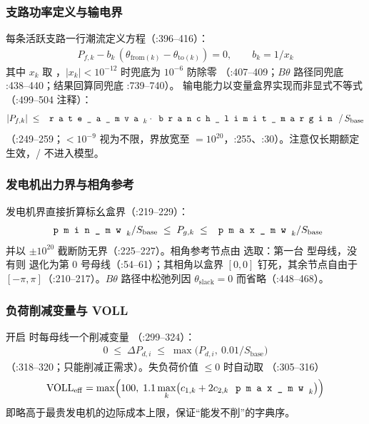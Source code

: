\subsubsection*{支路功率定义与输电界}
每条活跃支路一行潮流定义方程（:396--416）：
\begin{align*}
P_{f,k} - b_k\,(\theta_{\mathrm{from}(k)}-\theta_{\mathrm{to}(k)}) = 0,
\qquad b_k = 1/x_k
\end{align*}
其中 $x_k$ 取 ，$|x_k|<10^{-12}$ 时兜底为 $10^{-6}$ 防除零
（:407--409；$B\theta$ 路径同兜底 :438--440；结果回算同兜底 :739--740）。
输电能力以变量盒界实现而非显式不等式（:499--504 注释）：
\begin{align*}
|P_{f,k}| \;\le\; \fld{rate\_a\_mva}_k\cdot\fld{branch\_limit\_margin}\,/\,S_{\mathrm{base}}
\end{align*}
（:249--259；$<10^{-9}$ 视为不限，界放宽至
$=10^{20}$，:255、:30）。注意仅长期额定 
生效，/ 不进入模型。

\subsubsection*{发电机出力界与相角参考}
发电机界直接折算标幺盒界（:219--229）：
\begin{align*}
\fld{pmin\_mw}_k/S_{\mathrm{base}} \;\le\; P_{g,k} \;\le\;
\fld{pmax\_mw}_k/S_{\mathrm{base}}
\end{align*}
并以 $\pm 10^{20}$ 截断防无界（:225--227）。相角参考节点由
 选取：第一台  型母线，没有则
退化为第 0 号母线（:54--61）；其相角以盒界 $[0,0]$ 钉死，其余节点自由于
$[-\pi,\pi]$（:210--217）。$B\theta$ 路径中松弛列因 $\theta_{\mathrm{slack}}
=0$ 而省略（:448--468）。

\subsubsection*{负荷削减变量与 VOLL}
开启  时每母线一个削减变量
（:299--324）：
\begin{align*}
0 \;\le\; \Delta P_{d,i} \;\le\; \max\!\bigl(P_{d,i},\ 0.01/S_{\mathrm{base}}\bigr)
\end{align*}
（:318--320；只能削减正需求）。失负荷价值 $\le 0$ 时自动取
（:305--316）
\begin{align*}
\mathrm{VOLL}_{\mathrm{eff}} = \max\Bigl(100,\;
1.1\max_{k}\bigl(c_{1,k}+2c_{2,k}\,\fld{pmax\_mw}_k\bigr)\Bigr)
\end{align*}
即略高于最贵发电机的边际成本上限，保证“能发不削”的字典序。

